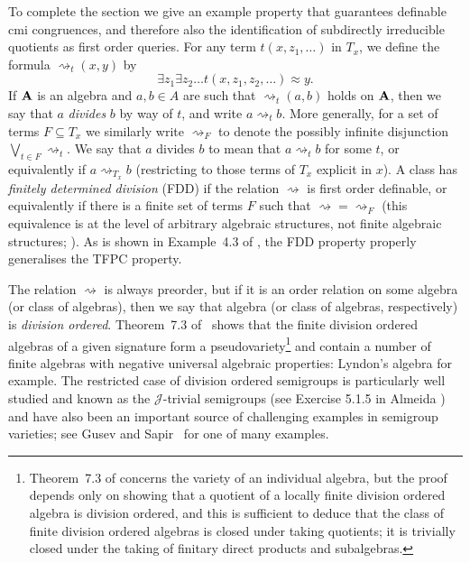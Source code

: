 \documentclass[reqno]{amsart}
\theoremstyle{plain}
\theoremstyle{definition}
\newcommand{\divides}{\rightsquigarrow}
\begin{document}
To complete the section we give an example property that guarantees definable cmi congruences, and therefore also the identification of subdirectly irreducible quotients as first order queries.  For any term $t(x,z_1,\dots)$
in $T_x$, we define the formula ${\divides_t}(x,y)$ by 
\[
\exists z_1\exists z_2\dots t(x,z_1,z_2,\dots)\approx y.
\]
If ${\bf A}$ is an algebra and $a,b\in A$ are such that ${\divides_t}(a,b)$ holds on ${\bf A}$, then we say that  $a$ \emph{divides} $b$ by way of $t$, and write $a\divides_t b$.  More generally, for a set of terms $F\subseteq T_x$ we similarly write $\divides_F$ to denote the possibly infinite disjunction  $\bigvee_{t\in F}\divides_t$.  We say that $a$ divides $b$ to mean that $a\divides_tb$ for some $t$, or equivalently if $a\divides_{T_x}b$ (restricting to those terms of $T_x$ explicit in $x$).  A class has \emph{finitely determined division} (FDD) if the relation $\divides$ is first order definable, or equivalently if there is a finite set of terms $F$ such that ${\divides}={\divides_F}$ (this equivalence is at the level of arbitrary algebraic structures, not finite algebraic structures; \cite[Theorem 5.1]{jactro10}).  As is shown in Example~4.3 of \cite{jactro10}, the FDD property properly generalises the TFPC property.

The relation $\divides$ is always preorder, but if it is an order relation on some algebra (or class of algebras), then we say that algebra (or class of algebras, respectively) is \emph{division ordered}.    
Theorem~7.3 of~\cite{jactro10}  shows that the finite division ordered algebras of a given signature  form a pseudovariety\footnote{Theorem~7.3 of \cite{jactro10} concerns the variety of an individual algebra, but the proof  depends only on showing that a quotient of a locally finite division ordered algebra is division ordered, and this is sufficient to deduce that the class of finite division ordered algebras is closed under taking quotients; it is trivially closed under the taking of finitary direct products and  subalgebras.} and contain a number of finite algebras with negative universal algebraic properties: Lyndon's algebra \cite{lyn} for example.   The restricted case of division ordered semigroups is particularly well studied and known as the $\mathscr{J}$-trivial semigroups (see Exercise 5.1.5 in Almeida \cite{alm}) and have also been an important source of challenging examples in semigroup varieties; see Gusev and Sapir~\cite{gussap} for one of many examples.    
\end{document}
